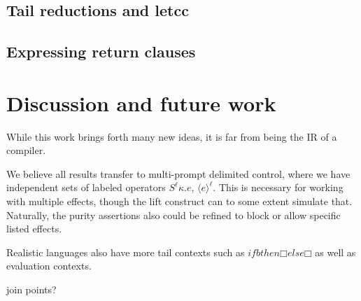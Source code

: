 \documentclass[a4paper, 11pt,titlepage, openright, twoside]{report}
\newcommand{\+}{\enspace}
\begin{document}
\section*{Tail reductions and letcc}

\section*{Expressing return clauses}

\chapter{Discussion and future work}

While this work brings forth many new ideas, it is far from being the IR of a compiler.

We believe all results transfer to multi-prompt delimited control, where we have independent sets of labeled operators $S^\ell κ. e$, $⟨e⟩^\ell$.
This is necessary for working with multiple effects, though the lift construct can to some extent simulate that.
Naturally, the purity assertions also could be refined to block or allow specific listed effects.

Realistic languages also have more tail contexts such as $if b then □ else □$ as well as evaluation contexts.

join points?





\hfuzz=1pt
\printbibliography[heading=bibintoc]
\end{document}
